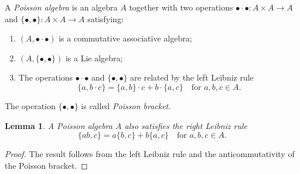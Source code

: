 \documentclass[a4paper, 12pt, reqno]{amsart}
\newtheorem{lemma}[theorem]{Lemma}
\theoremstyle{remark}
\begin{document}
A \emph{Poisson algebra} is an algebra $A$ together with two operations $\bullet\cdot\bullet: A \times A \to A$ and $\{\bullet, \bullet\}: A \times A \to A$ satisfying:
\begin{enumerate}
\item $(A, \bullet\cdot\bullet)$ is a commutative associative algebra;
\item $(A, \{\bullet, \bullet\})$ is a Lie algebra;
\item The operations $\bullet\cdot\bullet$ and $\{\bullet, \bullet\}$ are related by the left Leibniz rule
  \begin{equation*}
    \{a, b\cdot c\} = \{a, b\}\cdot c + b\cdot\{a, c\} \quad \text{for $a, b, c \in A$}.
  \end{equation*}
\end{enumerate}
The operation $\{\bullet, \bullet\}$ is called \emph{Poisson bracket}.

\begin{lemma}
  \label{lmm:39}
  A Poisson algebra $A$ also satisfies the right Leibniz rule
  \begin{equation*}
    \{ab, c\} = a\{b, c\} + b\{a, c\} \quad \text{for $a, b, c \in A$}.
  \end{equation*}
\end{lemma}

\begin{proof}
  The result follows from the left Leibniz rule and the anticommutativity of the Poisson bracket.
\end{proof}
\end{document}
